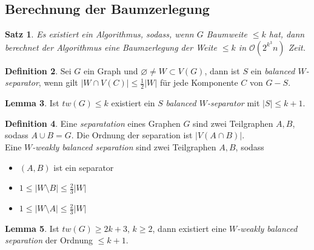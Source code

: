 \documentclass[a4paper, 12pt]{article}
\theoremstyle{plain}
\newtheorem{theorem}{Satz}[subsection] %
\theoremstyle{definition}
\newtheorem{definition}[theorem]{Definition} %
\theoremstyle{lemma}
\newtheorem{lemma}[theorem]{Lemma}
\theoremstyle{remark}
\theoremstyle{corollary}
\theoremstyle{example}
\begin{document}
	\subsection{Berechnung der Baumzerlegung}
	\begin{theorem}
		Es existiert ein Algorithmus, sodass, wenn $G$ Baumweite $\leq k$ hat, dann berechnet der Algorithmus eine Baumzerlegung der Weite $\leq k$ in $\mathcal{O}(2^{k^3}n)$ Zeit.
	\end{theorem}
	\begin{definition}
		Sei $G$ ein Graph und $\varnothing\neq W\subset V(G)$, dann ist $S$ ein \textit{balanced $W$-separator}, wenn gilt $\left|W \cap V(C)\right| \leq \frac{1}{2}\left|W\right|$ für jede Komponente $C$ von $G-S$.
	\end{definition}
	\begin{lemma}
		Ist $tw(G)\leq k$ existiert ein $S$ \textit{balanced $W$-separator} mit $\left|S\right| \leq k+1$.
	\end{lemma}
	\begin{definition}
		Eine \textit{separatation} eines Graphen $G$ sind zwei Teilgraphen $A,B$, sodass $A\cup B = G$. Die Ordnung der separation ist $\left|V(A\cap B)\right|$.\\
		Eine \textit{$W$-weakly balanced separation} sind zwei Teilgraphen $A,B$, sodass \begin{itemize}
			\item $(A,B)$ ist ein separator
			\item $1\leq \left|W\setminus B\right| \leq \frac{2}{3} \left|W\right|$
			\item $1\leq \left|W\setminus A\right| \leq \frac{2}{3} \left|W\right|$
		\end{itemize}
	\end{definition}
	\begin{lemma}
		Ist $tw(G)\geq 2k+3$, $k\geq 2$, dann existiert eine \textit{$W$-weakly balanced separation} der Ordnung $\leq k+1$.
	\end{lemma}
\end{document}
